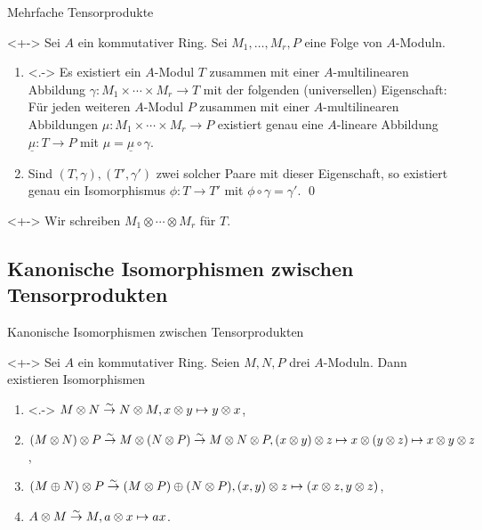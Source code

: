 \begin{frame}{Mehrfache Tensorprodukte}
	\begin{proposition}<+->
		Sei \(A\) ein kommutativer Ring. Sei \(M_1, \dotsc, M_r, P\) eine Folge von \(A\)-Moduln.
		\begin{enumerate}[<+->]
		\item<.->
			Es existiert ein \(A\)-Modul \(T\) zusammen mit einer \(A\)-multilinearen Abbildung
			\(\gamma\colon M_1 \times \dotsb \times M_r \to T\) mit der folgenden (universellen) Eigenschaft:
			\\
			Für jeden weiteren \(A\)-Modul \(P\) zusammen mit einer \(A\)-multilinearen Abbildungen
			\(\mu\colon M_1 \times \dotsb \times M_r \to P\) existiert genau eine \(A\)-lineare Abbildung
			\(\underline\mu\colon T \to P\) mit \(\mu = \underline\mu \circ \gamma\).
		\item
			Sind \((T, \gamma), (T', \gamma')\) zwei solcher Paare mit dieser Eigenschaft, so
			existiert genau ein Isomorphismus \(\phi\colon T \to T'\) mit \(\phi \circ \gamma = \gamma'\).
			\qed
		\end{enumerate}
	\end{proposition}
	\begin{visibleenv}<+->
		Wir schreiben \(M_1 \otimes \dotsb \otimes M_r\) für \(T\).
	\end{visibleenv}
\end{frame}

\subsection{Kanonische Isomorphismen zwischen Tensorprodukten}

\begin{frame}{Kanonische Isomorphismen zwischen Tensorprodukten}
	\begin{proposition}<+->
		Sei \(A\) ein kommutativer Ring. Seien \(M, N, P\) drei \(A\)-Moduln. Dann existieren Isomorphismen
		\begin{enumerate}[<+->]
		\item<.->
			\(M \otimes N \stackrel\sim\to N \otimes M, x \otimes y \mapsto y \otimes x\),
		\item
			\((M \otimes N) \otimes P \stackrel\sim\to M \otimes (N \otimes P) \stackrel\sim\to  M \otimes N \otimes P,
			(x \otimes y) \otimes z \mapsto x \otimes (y \otimes z) \mapsto x \otimes y \otimes z\),
		\item
			\((M \oplus N) \otimes P \stackrel\sim\to (M \otimes P) \oplus (N \otimes P),
			(x, y) \otimes z \mapsto (x \otimes z, y \otimes z)\),
		\item
			\(A \otimes M \stackrel\sim\to M, a \otimes x \mapsto ax\).
		\end{enumerate}
	\end{proposition}
\end{frame}

